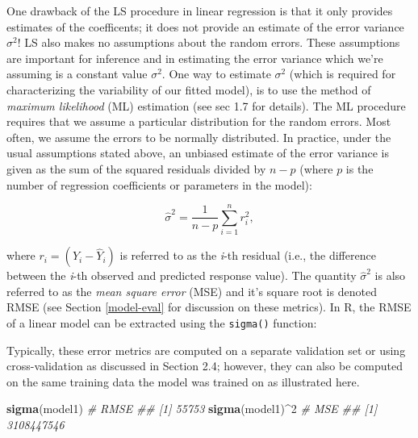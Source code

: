 \documentclass[]{krantz}
\makeatletter
\newenvironment{Shaded}{\begin{snugshade}}{\end{snugshade}}
\newcommand{\CommentTok}[1]{\textcolor[rgb]{0.37,0.37,0.37}{\textit{#1}}}
\newcommand{\DecValTok}[1]{\textcolor[rgb]{0.06,0.06,0.06}{#1}}
\newcommand{\KeywordTok}[1]{\textcolor[rgb]{0.27,0.27,0.27}{\textbf{#1}}}
\newcommand{\NormalTok}[1]{#1}
\newcommand{\OperatorTok}[1]{\textcolor[rgb]{0.43,0.43,0.43}{\textbf{#1}}}
\newenvironment{kframe}{%
\medskip{}
\setlength{\fboxsep}{.8em}
 \def\at@end@of@kframe{}%
 \ifinner\ifhmode%
  \def\at@end@of@kframe{\end{minipage}}%
  \begin{minipage}{\columnwidth}%
 \fi\fi%
 \def\FrameCommand##1{\hskip\@totalleftmargin \hskip-\fboxsep
 \colorbox{shadecolor}{##1}\hskip-\fboxsep
     \hskip-\linewidth \hskip-\@totalleftmargin \hskip\columnwidth}%
 \MakeFramed {\advance\hsize-\width
   \@totalleftmargin\z@ \linewidth\hsize
   \@setminipage}}%
 {\par\unskip\endMakeFramed%
 \at@end@of@kframe}
\newenvironment{block}[1]
  {
  \begin{itemize}
  \renewcommand{\labelitemi}{
    \raisebox{-.7\height}[0pt][0pt]{
      {\setkeys{Gin}{width=3em,keepaspectratio}\texttt{[image: icons/\#1]}}
    }
  }
  \setlength{\fboxsep}{1em}
  \begin{kframe}
  \item
  }
  {
  \end{kframe}
  \end{itemize}
  }
\newenvironment{note}
  {\begin{block}{note}}
  {\end{block}}
\renewenvironment{Shaded}{\begin{kframe}}{\end{kframe}}
\makeatother
\begin{document}
One drawback of the LS procedure in linear regression is that it only provides estimates of the coefficents; it does not provide an estimate of the error variance \(\sigma^2\)! LS also makes no assumptions about the random errors. These assumptions are important for inference and in estimating the error variance which we're assuming is a constant value \(\sigma^2\). One way to estimate \(\sigma^2\) (which is required for characterizing the variability of our fitted model), is to use the method of \emph{maximum likelihood} (ML) estimation (see \citet{kutner-2005-applied} sec 1.7 for details). The ML procedure requires that we assume a particular distribution for the random errors. Most often, we assume the errors to be normally distributed. In practice, under the usual assumptions stated above, an unbiased estimate of the error variance is given as the sum of the squared residuals divided by \(n - p\) (where \(p\) is the number of regression coefficients or parameters in the model):

\begin{equation}
  \widehat{\sigma}^2 = \frac{1}{n - p}\sum_{i = 1} ^ n r_i ^ 2,
\end{equation}

where \(r_i = \left(Y_i - \widehat{Y}_i\right)\) is referred to as the \emph{i}-th residual (i.e., the difference between the \emph{i}-th observed and predicted response value). The quantity \(\widehat{\sigma}^2\) is also referred to as the \emph{mean square error} (MSE) and it's square root is denoted RMSE (see Section \ref{model-eval} for discussion on these metrics). In R, the RMSE of a linear model can be extracted using the \texttt{sigma()} function:

\begin{note}
Typically, these error metrics are computed on a separate validation set
or using cross-validation as discussed in Section 2.4; however, they can
also be computed on the same training data the model was trained on as
illustrated here.
\end{note}

\begin{Shaded}
\begin{Highlighting}[]
\KeywordTok{sigma}\NormalTok{(model1)    }\CommentTok{# RMSE}
\CommentTok{## [1] 55753}
\KeywordTok{sigma}\NormalTok{(model1)}\OperatorTok{^}\DecValTok{2}  \CommentTok{# MSE}
\CommentTok{## [1] 3108447546}
\end{Highlighting}
\end{Shaded}
\end{document}
